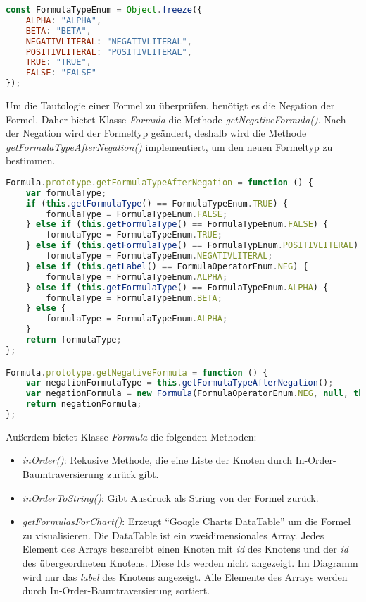 \begin{lstlisting}[language=JavaScript, caption= FormulaTypeEnum, basicstyle=\scriptsize]
const FormulaTypeEnum = Object.freeze({
    ALPHA: "ALPHA",
    BETA: "BETA",
    NEGATIVLITERAL: "NEGATIVLITERAL",
    POSITIVLITERAL: "POSITIVLITERAL",
    TRUE: "TRUE",
    FALSE: "FALSE"
});
\end{lstlisting}

Um die Tautologie einer Formel zu überprüfen, benötigt es die Negation der Formel. Daher bietet Klasse \textit{Formula} die Methode \textit{getNegativeFormula()}. Nach der Negation wird der Formeltyp geändert, deshalb wird die Methode \textit{getFormulaTypeAfterNegation()} implementiert, um den neuen Formeltyp zu bestimmen.

\begin{lstlisting}[language=JavaScript, caption= getNegativeFormula() und getFormulaTypeAfterNegation() (Klasse Formula) , basicstyle=\scriptsize]
Formula.prototype.getFormulaTypeAfterNegation = function () {
    var formulaType;
    if (this.getFormulaType() == FormulaTypeEnum.TRUE) {
        formulaType = FormulaTypeEnum.FALSE;
    } else if (this.getFormulaType() == FormulaTypeEnum.FALSE) {
        formulaType = FormulaTypeEnum.TRUE;
    } else if (this.getFormulaType() == FormulaTypEnum.POSITIVLITERAL) {
        formulaType = FormulaTypeEnum.NEGATIVLITERAL;
    } else if (this.getLabel() == FormulaOperatorEnum.NEG) {
        formulaType = FormulaTypeEnum.ALPHA;
    } else if (this.getFormulaType() == FormulaTypeEnum.ALPHA) {
        formulaType = FormulaTypeEnum.BETA;
    } else {
        formulaType = FormulaTypeEnum.ALPHA;
    }
    return formulaType;
};

Formula.prototype.getNegativeFormula = function () {
    var negationFormulaType = this.getFormulaTypeAfterNegation();
    var negationFormula = new Formula(FormulaOperatorEnum.NEG, null, this, negationFormulaType);
    return negationFormula;
};
\end{lstlisting}

Außerdem bietet Klasse \textit{Formula} die folgenden Methoden:
\begin{itemize}
\item	\textit{inOrder()}: Rekusive Methode, die eine Liste der Knoten durch In-Order-Baumtraversierung zurück gibt. 
\item	\textit{inOrderToString()}: Gibt Ausdruck als String von der Formel zurück.
\item	\textit{getFormulasForChart()}: Erzeugt ``Google Charts DataTable'' um die Formel zu visualisieren. Die DataTable ist ein zweidimensionales Array. Jedes Element des Arrays beschreibt einen Knoten mit \textit{id} des Knotens und der \textit{id} des übergeordneten Knotens. Diese Ids werden nicht angezeigt. Im Diagramm wird nur das \textit{label} des Knotens angezeigt. Alle Elemente des Arrays werden durch In-Order-Baumtraversierung sortiert.
\end{itemize}

